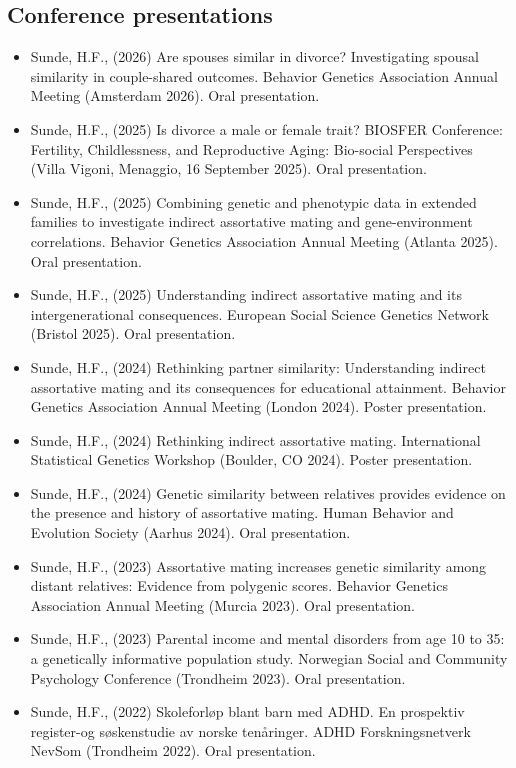 \documentclass[10pt,a4paper]{article}
\begin{document}
\subsection*{Conference presentations}
\begin{itemize}
\item Sunde, H.F., (2026) Are spouses similar in divorce? Investigating spousal similarity in couple-shared outcomes. Behavior Genetics Association Annual Meeting (Amsterdam 2026). Oral presentation.
\item Sunde, H.F., (2025) Is divorce a male or female trait? BIOSFER Conference: Fertility, Childlessness, and Reproductive Aging: Bio-social Perspectives (Villa Vigoni, Menaggio, 16 September 2025). Oral presentation.
\item Sunde, H.F., (2025) Combining genetic and phenotypic data in extended families to investigate indirect assortative mating and gene-environment correlations. Behavior Genetics Association Annual Meeting (Atlanta 2025). Oral presentation.
\item Sunde, H.F., (2025) Understanding indirect assortative mating and its intergenerational consequences. European Social Science Genetics Network (Bristol 2025). Oral presentation.
\item Sunde, H.F., (2024) Rethinking partner similarity: Understanding indirect assortative mating and its consequences for educational attainment. Behavior Genetics Association Annual Meeting (London 2024). Poster presentation.
\item Sunde, H.F., (2024) Rethinking indirect assortative mating. International Statistical Genetics Workshop (Boulder, CO 2024). Poster presentation.
\item Sunde, H.F., (2024) Genetic similarity between relatives provides evidence on the presence and history of assortative mating. Human Behavior and Evolution Society (Aarhus 2024). Oral presentation.
\item Sunde, H.F., (2023) Assortative mating increases genetic similarity among distant relatives: Evidence from polygenic scores. Behavior Genetics Association Annual Meeting (Murcia 2023). Oral presentation.
\item Sunde, H.F., (2023) Parental income and mental disorders from age 10 to 35: a genetically informative population study. Norwegian Social and Community Psychology Conference (Trondheim 2023). Oral presentation.
\item Sunde, H.F., (2022) Skoleforløp blant barn med ADHD. En prospektiv register-og søskenstudie av norske tenåringer. ADHD Forskningsnetverk NevSom (Trondheim 2022). Oral presentation.
\end{itemize}
\end{document}
